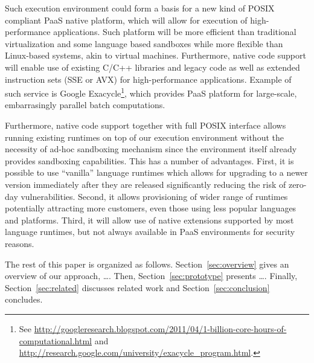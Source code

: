 Such execution environment could form a basis for a new kind of
POSIX compliant PaaS native platform, which will allow for execution of
high-performance applications. Such platform will be more efficient than
traditional virtualization and some language based sandboxes while more
flexible than Linux-based systems, akin to virtual machines.
Furthermore, native code support will enable use of existing C/C++
libraries and legacy code as well as extended instruction sets (\eg SSE
or AVX) for high-performance applications. Example of such service is
Google
Exacycle\footnote{See \url{http://googleresearch.blogspot.com/2011/04/1-billion-core-hours-of-computational.html} and
\url{http://research.google.com/university/exacycle_program.html}.},
which provides PaaS platform for large-scale, embarrasingly parallel
batch computations.

Furthermore, native code support together with full POSIX interface
allows running existing runtimes on top of our execution environment
without the necessity of ad-hoc sandboxing mechanism since the
environment itself already provides sandboxing capabilities. This has a
number of advantages.  First, it is possible to use ``vanilla'' language
runtimes which allows for upgrading to a newer version immediately after
they are released significantly reducing the risk of zero-day
vulnerabilities. Second, it allows provisioning of wider range of
runtimes potentially attracting more customers, even those using less
popular languages and platforms.  Third, it will allow use of native
extensions supported by most language runtimes, but not always available in
PaaS environments for security reasons.




The rest of this paper is organized as follows.
Section~\ref{sec:overview} gives an overview of our approach, \ldots.
Then, Section~\ref{sec:prototype} presents \ldots. Finally,
Section~\ref{sec:related} discusses related work and
Section~\ref{sec:conclusion} concludes.

